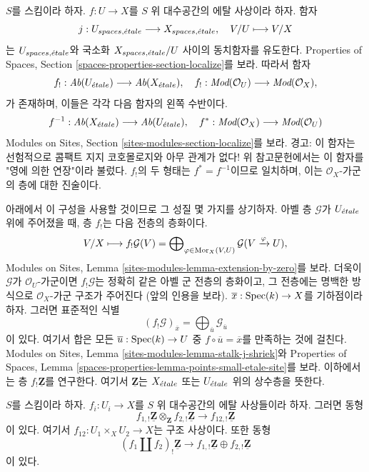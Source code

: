 \noindent
$S$를 스킴이라 하자. $f : U \to X$를 $S$ 위 대수공간의 에탈
사상이라 하자. 함자
$$
j : U_{spaces, {\acute{e}tale}} \longrightarrow X_{spaces, {\acute{e}tale}},\quad
V/U \longmapsto V/X
$$
는 $U_{spaces, {\acute{e}tale}}$와 국소화 $X_{spaces, {\acute{e}tale}}/U$ 사이의
동치함자를 유도한다. Properties of Spaces, Section
\ref{spaces-properties-section-localize}를 보라. 따라서 함자
$$
f_! : \textit{Ab}(U_{\acute{e}tale}) \longrightarrow
\textit{Ab}(X_{\acute{e}tale}),\quad
f_! : \textit{Mod}(\mathcal{O}_U) \longrightarrow \textit{Mod}(\mathcal{O}_X),
$$
가 존재하며, 이들은 각각 다음 함자의 왼쪽 수반이다.
$$
f^{-1} : \textit{Ab}(X_{\acute{e}tale}) \longrightarrow
\textit{Ab}(U_{\acute{e}tale}),\quad
f^* : \textit{Mod}(\mathcal{O}_X) \longrightarrow \textit{Mod}(\mathcal{O}_U)
$$
Modules on Sites, Section \ref{sites-modules-section-localize}를 보라.
경고: 이 함자는 선험적으로 콤팩트 지지 코호몰로지와 아무 관계가 없다!
위 참고문헌에서는 이 함자를 "영에 의한 연장"이라 불렀다.
$f_!$의 두 형태는 $f^* = f^{-1}$이므로 일치하며,
이는 $\mathcal{O}_X$-가군의 층에 대한 진술이다.

\medskip\noindent
아래에서 이 구성을 사용할 것이므로 그 성질 몇 가지를 상기하자.
아벨 층 $\mathcal{G}$가 $U_{\acute{e}tale}$ 위에 주어졌을 때,
층 $f_!$는 다음 전층의 층화이다.
$$
V/X \longmapsto
f_!\mathcal{G}(V) =
\bigoplus\nolimits_{\varphi \in \mathop{\mathrm{Mor}}\nolimits_X(V, U)}
\mathcal{G}(V \xrightarrow{\varphi} U),
$$
Modules on Sites, Lemma \ref{sites-modules-lemma-extension-by-zero}를 보라.
더욱이 $\mathcal{G}$가 $\mathcal{O}_U$-가군이면
$f_!\mathcal{G}$는 정확히 같은 아벨 군 전층의 층화이고,
그 전층에는 명백한 방식으로 $\mathcal{O}_X$-가군 구조가 주어진다
(앞의 인용을 보라). $\overline{x} : \mathop{\mathrm{Spec}}(k) \to X$를 기하점이라
하자. 그러면 표준적인 식별
$$
(f_!\mathcal{G})_{\overline{x}} =
\bigoplus\nolimits_{\overline{u}} \mathcal{G}_{\overline{u}}
$$
이 있다. 여기서 합은 모든 $\overline{u} : \mathop{\mathrm{Spec}}(k) \to U$ 중
$f \circ \overline{u} = \overline{x}$를 만족하는 것에 걸친다.
Modules on Sites,
Lemma \ref{sites-modules-lemma-stalk-j-shriek}와 Properties of Spaces,
Lemma \ref{spaces-properties-lemma-points-small-etale-site}를 보라.
이하에서는 층 $f_!\underline{\mathbf{Z}}$를 연구한다.
여기서 $\underline{\mathbf{Z}}$는 $X_{\acute{e}tale}$ 또는 $U_{\acute{e}tale}$ 위의
상수층을 뜻한다.

\begin{lemma}
\label{lemma-product-is-tensor-product}
$S$를 스킴이라 하자. $f_i : U_i \to X$를 $S$ 위 대수공간의
에탈 사상들이라 하자. 그러면 동형
$$
f_{1, !}\underline{\mathbf{Z}} \otimes_{\mathbf{Z}}
f_{2, !}\underline{\mathbf{Z}}
\longrightarrow
f_{12, !}\underline{\mathbf{Z}}
$$
이 있다. 여기서 $f_{12} : U_1 \times_X U_2 \to X$는 구조 사상이다.
또한 동형
$$
(f_1 \amalg f_2)_! \underline{\mathbf{Z}}
\longrightarrow
f_{1, !}\underline{\mathbf{Z}} \oplus
f_{2, !}\underline{\mathbf{Z}}
$$
이 있다.
\end{lemma}

